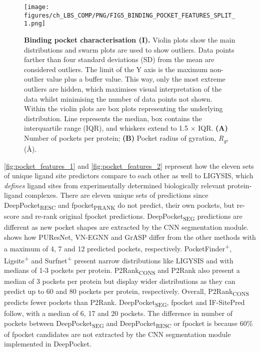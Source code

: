\begin{figure}[ht!]
    \centering
    \texttt{[image: figures/ch\_LBS\_COMP/PNG/FIG5\_BINDING\_POCKET\_FEATURES\_SPLIT\_1.png]}
    \caption[Binding pocket characterisation (I)]{\textbf{Binding pocket characterisation (I).} Violin plots show the main distributions and swarm plots are used to show outliers. Data points farther than four standard deviations (SD) from the mean are considered outliers. The limit of the Y axis is the maximum non-outlier value plus a buffer value. This way, only the most extreme outliers are hidden, which maximises visual interpretation of the data whilst minimising the number of data points not shown. Within the violin plots are box plots representing the underlying distribution. Line represents the median, box contains the interquartile range (IQR), and whiskers extend to 1.5 $\times$ IQR. \textbf{(A)} Number of pockets per protein; \textbf{(B)} Pocket radius of gyration, \textit{R\textsubscript{g}}, (\AA{}).}
    \label{fig:pocket_features_1}
\end{figure}

\autoref{fig:pocket_features_1} and \autoref{fig:pocket_features_2} represent how the eleven sets of unique ligand site predictors compare to each other as well to LIGYSIS, which \textit{defines} ligand sites from experimentally determined biologically relevant protein-ligand complexes. There are eleven unique sets of predictions since DeepPocket\textsubscript{RESC} and fpocket\textsubscript{PRANK} do not predict, their own pockets, but re-score and re-rank original fpocket predictions. DeepPocket\textsubscript{SEG} predictions are different as new pocket shapes are extracted by the CNN segmentation module.  shows how PUResNet, VN-EGNN and GrASP differ from the other methods with a maximum of 4, 7 and 12 predicted pockets, respectively. PocketFinder\textsuperscript{+}, Ligsite\textsuperscript{+} and Surfnet\textsuperscript{+} present narrow distributions like LIGYSIS and with medians of 1-3 pockets per protein. P2Rank\textsubscript{CONS} and P2Rank also present a median of 3 pockets per protein but display wider distributions as they can predict up to 60 and 80 pockets per protein, respectively. Overall, P2Rank\textsubscript{CONS} predicts fewer pockets than P2Rank. DeepPocket\textsubscript{SEG}, fpocket and IF-SitePred follow, with a median of 6, 17 and 20 pockets. The difference in number of pockets between DeepPocket\textsubscript{SEG} and DeepPocket\textsubscript{RESC} or fpocket is because 60\% of fpocket candidates are not extracted by the CNN segmentation module implemented in DeepPocket.


